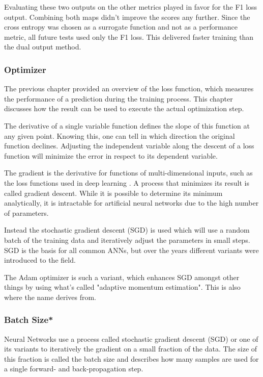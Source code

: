 Evaluating these two outputs on the other metrics played in favor for the F1 loss output. Combining both maps didn't improve the scores any further. Since the cross entropy was chosen as a surrogate function and not as a performance metric, all future tests used only the F1 loss. This delivered faster training than the dual output method.

\subsubsection{Optimizer}

The previous chapter provided an overview of the loss function, which measures the performance of a prediction during the training process. This chapter discusses how the result can be used to execute the actual optimization step.

The derivative of a single variable function defines the slope of this function at any given point. Knowing this, one can tell in which direction the original function declines. Adjusting the independent variable along the descent of a loss function will minimize the error in respect to its dependent variable.

The gradient is the derivative for functions of multi-dimensional inputs, such as the loss functions used in deep learning \cite{Chollet2017}. A process that minimizes its result is called gradient descent. While it is possible to determine its minimum analytically, it is intractable for artificial neural networks due to the high number of parameters.

Instead the stochastic gradient descent (SGD) is used which will use a random batch of the training data and iteratively adjust the parameters in small steps. SGD is the basis for all common ANNs, but over the years different variants were introduced to the field.

The Adam optimizer is such a variant, which enhances SGD amongst other things by using what's called "adaptive momentum estimation". This is also where the name derives from.


\subsubsection{Batch Size*}

Neural Networks use a process called stochastic gradient descent (SGD) or one of its variants to iteratively the gradient on a small fraction of the data. The size of this fraction is called the batch size and describes how many samples are used for a single forward- and back-propagation step.

